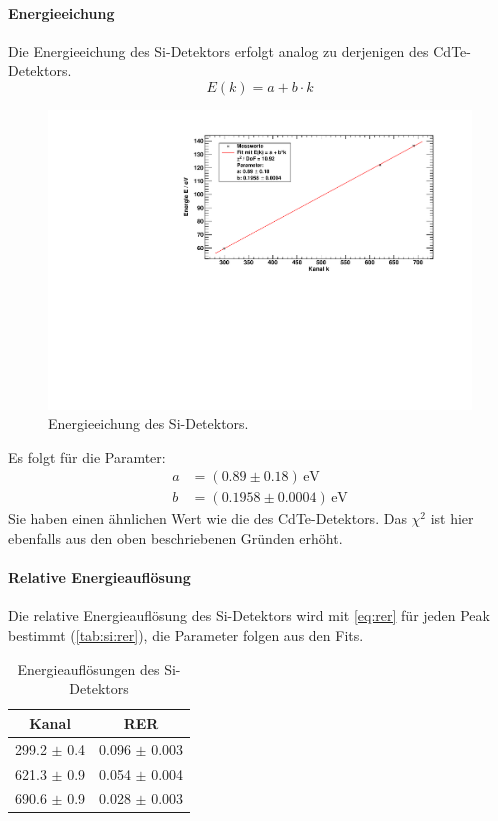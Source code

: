 \paragraph{Energieeichung}
Die Energieeichung des Si-Detektors erfolgt analog zu derjenigen des CdTe-Detektors.
\begin{equation}
    E(k) = a + b\cdot k
\end{equation}
\begin{figure}[H]
\begin{center}
  \includegraphics[width=\textwidth]{../img/part3/energygauge_Si.pdf}
  \caption{Energieeichung des Si-Detektors.}
  \label{img:si:energygauge}
\end{center}
\end{figure}
Es folgt für die Paramter:
\begin{equation}
\begin{split}
  a &= (0.89 \pm 0.18)\,\text{eV} \\
  b &= (0.1958 \pm 0.0004)\,\text{eV}
\end{split}
\end{equation}
Sie haben einen ähnlichen Wert wie die des CdTe-Detektors. 
Das $\chi^2$ ist hier ebenfalls aus den oben beschriebenen Gründen erhöht.

\paragraph{Relative Energieauflösung}
Die relative Energieauflösung des Si-Detektors wird mit \autoref{eq:rer} für jeden Peak bestimmt (\autoref{tab:si:rer}), 
die Parameter folgen aus den Fits.
\begin{table}[H]
\begin{center}
\begin{tabular}{|c|c|}
\hline 
Kanal & RER \\ \hline
299.2 $\pm$ 0.4 & 0.096 $\pm$ 0.003 \\ \hline
621.3 $\pm$ 0.9 & 0.054 $\pm$ 0.004 \\ \hline
690.6 $\pm$ 0.9 & 0.028 $\pm$ 0.003 \\ \hline
\end{tabular}
\caption{Energieauflösungen des Si-Detektors}
\label{tab:si:rer}
\end{center}
\end{table}

